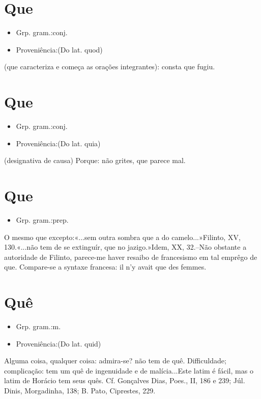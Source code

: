 \section{Que}
\begin{itemize}
\item {Grp. gram.:conj.}
\end{itemize}
\begin{itemize}
\item {Proveniência:(Do lat. \textunderscore quod\textunderscore )}
\end{itemize}
(que caracteriza e começa as orações integrantes): \textunderscore consta que fugiu\textunderscore .
\section{Que}
\begin{itemize}
\item {Grp. gram.:conj.}
\end{itemize}
\begin{itemize}
\item {Proveniência:(Do lat. \textunderscore quia\textunderscore )}
\end{itemize}
(designativa de \textunderscore causa\textunderscore )
Porque: \textunderscore não grites, que parece mal\textunderscore .
\section{Que}
\begin{itemize}
\item {Grp. gram.:prep.}
\end{itemize}
O mesmo que \textunderscore excepto\textunderscore :«\textunderscore ...sem outra sombra que a do camelo...\textunderscore »Filinto, XV, 130.«\textunderscore ...não tem de se extinguír, que no jazigo.\textunderscore »\textunderscore Idem\textunderscore , XX, 32.--Não obstante a autoridade de Filinto, parece-me haver resaibo de francesismo em tal emprêgo de \textunderscore que\textunderscore . Compare-se a syntaxe francesa: \textunderscore il n'y avait que des femmes\textunderscore .
\section{Quê}
\begin{itemize}
\item {Grp. gram.:m.}
\end{itemize}
\begin{itemize}
\item {Proveniência:(Do lat. \textunderscore quid\textunderscore )}
\end{itemize}
Alguma coisa, qualquer coisa: \textunderscore admira-se? não tem de quê\textunderscore .
Difficuldade; complicação: \textunderscore tem um quê de ingenuidade e de malícia...\textunderscore  \textunderscore Este latim é fácil, mas o latim de Horácio tem seus quês\textunderscore . Cf. Gonçalves Dias, \textunderscore Poes.\textunderscore , II, 186 e 239; Júl. Dinis, \textunderscore Morgadinha\textunderscore , 138; B. Pato, \textunderscore Ciprestes\textunderscore , 229.

